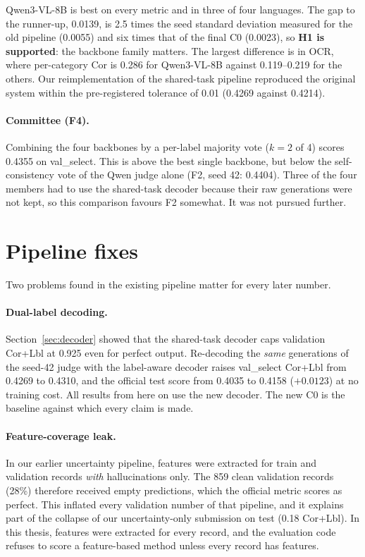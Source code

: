 Qwen3-VL-8B is best on every metric and in three of four languages. The gap to the runner-up, 0.0139, is 2.5 times the seed standard deviation measured for the old pipeline (0.0055) and six times that of the final C0 (0.0023), so \textbf{H1 is supported}: the backbone family matters. The largest difference is in OCR, where per-category Cor is 0.286 for Qwen3-VL-8B against 0.119--0.219 for the others. Our reimplementation of the shared-task pipeline reproduced the original system within the pre-registered tolerance of 0.01 (0.4269 against 0.4214).

\paragraph{Committee (F4).}
Combining the four backbones by a per-label majority vote ($k = 2$ of 4) scores 0.4355 on val\_select. This is above the best single backbone, but below the self-consistency vote of the Qwen judge alone (F2, seed 42: 0.4404). Three of the four members had to use the shared-task decoder because their raw generations were not kept, so this comparison favours F2 somewhat. It was not pursued further.

\section{Pipeline fixes}\label{sec:exp-fixes}

Two problems found in the existing pipeline matter for every later number.

\paragraph{Dual-label decoding.}
Section~\ref{sec:decoder} showed that the shared-task decoder caps validation Cor+Lbl at 0.925 even for perfect output. Re-decoding the \emph{same} generations of the seed-42 judge with the label-aware decoder raises val\_select Cor+Lbl from 0.4269 to 0.4310, and the official test score from 0.4035 to 0.4158 ($+0.0123$) at no training cost. All results from here on use the new decoder. The new C0 is the baseline against which every claim is made.

\paragraph{Feature-coverage leak.}
In our earlier uncertainty pipeline, features were extracted for train and validation records \emph{with} hallucinations only. The 859 clean validation records (28\%) therefore received empty predictions, which the official metric scores as perfect. This inflated every validation number of that pipeline, and it explains part of the collapse of our uncertainty-only submission on test (0.18 Cor+Lbl). In this thesis, features were extracted for every record, and the evaluation code refuses to score a feature-based method unless every record has features.

